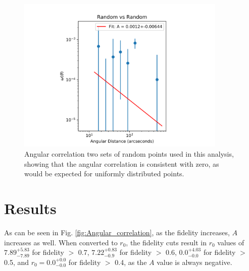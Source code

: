 \begin{figure}[tbp]
\centering \includegraphics[width=100mm]{clustering/Log_Random_vs_Random_15000NoParenFlip_bin10.png}
\caption{Angular correlation two sets of random points used in this analysis, showing that the angular correlation is consistent with zero, as would be expected for uniformly distributed points.}
\label{fig:random_points}
\end{figure}

\section{Results}

As can be seen in Fig. \ref{fig:Angular_correlation}, as the fidelity increases, $A$ increases as well. When converted to $r_0$, the fidelity cuts result in $r_0$ values of $7.89_{-7.89}^{+5.83}$ for fidelity $>$ 0.7, $7.22_{-0.9}^{+0.83}$ for fidelity $>$ 0.6, $0.0_{-0.0}^{+4.03}$ for fidelity $>$ 0.5, and $r_0 = 0.0_{-0.0}^{+0.0}$ for fidelity $>$ 0.4, as the $A$ value is always negative. 

